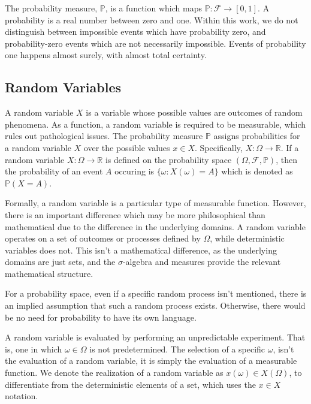The probability measure, $\mathbb{P}$, is a function which maps $\mathbb{P}:\mathcal{F}\rightarrow[0,1]$.  A probability is a real number between zero and one.  Within this work, we do not distinguish between impossible events which have probability zero, and probability-zero events which are not necessarily impossible.  Events of probability one happens almost surely, with almost total certainty.

\subsection{Random Variables}

A random variable $X$ is a variable whose possible values are outcomes of random phenomena.  As a function, a random variable is required to be measurable, which rules out pathological issues.  The probability measure $\mathbb{P}$ assigns probabilities for a random variable $X$ over the possible values $x \in X$.  Specifically, $X:\Omega\rightarrow\mathbb{R}$.  If a random variable $X:\Omega \rightarrow \mathbb{R}$ is defined on the probability space $(\Omega,\mathcal{F},\mathbb{P})$, then the probability of an event $A$ occuring is $\{\omega:X(\omega)=A\}$ which is denoted as $\mathbb{P}(X=A)$.

Formally, a random variable is a particular type of measurable function.  However, there is an important difference which may be more philosophical than mathematical due to the difference in the underlying domains.  A random variable operates on a set of outcomes or processes defined by $\Omega$, while deterministic variables does not.  This isn't a mathematical difference, as the underlying domains are just sets, and the $\sigma$-algebra and measures provide the relevant mathematical structure.

For a probability space, even if a specific random process isn't mentioned, there is an implied assumption that such a random process exists.  Otherwise, there would be no need for probability to have its own language.

A random variable is evaluated by performing an unpredictable experiment.  That is, one in which $\omega \in \Omega$ is not predetermined.  The selection of a specific $\omega$, isn't the evaluation of a random variable, it is simply the evaluation of a measurable function.  We denote the realization of a random variable as $x(\omega) \in X(\Omega)$, to differentiate from the deterministic elements of a set, which uses the $x \in X$ notation.


